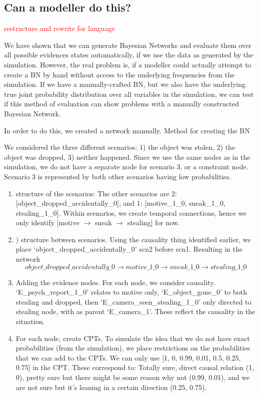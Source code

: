 \documentclass[12pt]{article}
\begin{document}
\subsection{Can a modeller do this?}



 \textcolor{red} {restructure and rewrite for language}


We have shown that we can generate Bayesian Networks and evaluate them over all possible evidences states automatically, if we use the data as generated by the simulation. However, the real problem is, if a modeller could actually attempt to create a BN by hand without access to the underlying frequencies from the simulation. If we have a manually-crafted BN, but we also have the underlying true joint probability distribution over all variables in the simulation, we can test if this method of evaluation can show problems with a manually constructed Bayesian Network.

In order to do this, we created a network manually.  
 Method for creating the BN
 
 We considered the three different scenarios: 1) the object was stolen, 2) the object was dropped, 3) neither happened. Since we use the same nodes as in the simulation, we do not have a separate node for scenario 3, or a constraint node. Scenario 3 is represented by both other scenarios having low probabilities.
 
 \begin{enumerate} 
 
\item structure of the scenarios: The other scenarios are 2: [object\_dropped\_accidentally\_0], and 1: [motive\_1\_0, sneak\_1\_0, stealing\_1\_0]. Within scenarios, we create temporal connections, hence we only identify [motive $\rightarrow$ sneak $\rightarrow$ stealing] for now.
\item) structure between scenarios. Using the causality thing identified earlier, we place `object\_dropped\_accidentally\_0' scn2 before scn1. Resulting in the network
 \[object\_dropped\_accidentally\_0 \rightarrow motive\_1\_0 \rightarrow sneak\_1\_0 \rightarrow stealing\_1\_0\]
\item Adding the evidence nodes. For each node, we consider causality. `E\_psych\_report\_1\_0' relates to motive only, `E\_object\_gone\_0' to both stealing and dropped, then `E\_camera\_seen\_stealing\_1\_0' only directed to stealing node, with as parent `E\_camera\_1'.  These reflect the causality in the situation.
\item For each node, create CPTs. To simulate the idea that we do not have exact probabilities (from the simulation), we place restrictions on the probabilities that we can add to the CPTs. We can only use [1, 0, 0.99, 0.01, 0.5, 0.25, 0.75] in the CPT. These correspond to: Totally sure, direct causal relation (1, 0), pretty sure but there might be some reason why not (0.99, 0.01), and we are not sure but it's leaning in a certain direction (0.25, 0.75).
 
 \end{enumerate}
 
\end{document}
